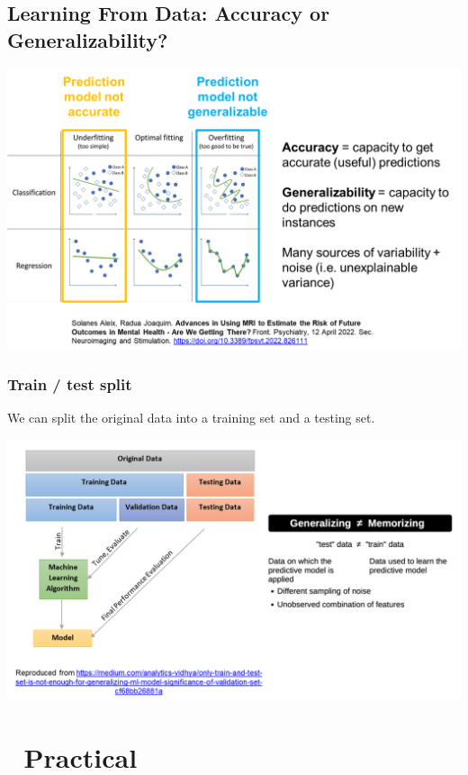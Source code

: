 \documentclass[
  letterpaper,
  DIV=11,
  numbers=noendperiod,
  oneside]{scrreprt}
\begin{document}
\hypertarget{learning-from-data-accuracy-or-generalizability}{%
\section{Learning From Data: Accuracy or
Generalizability?}\label{learning-from-data-accuracy-or-generalizability}}

\includegraphics{images/paste-FC3A1160.png}

\hypertarget{train-test-split}{%
\subsection{Train / test split}\label{train-test-split}}

We can split the original data into a training set and a testing set.

\includegraphics{images/paste-7D73149D.png}

\hypertarget{practical}{%
\chapter{\texorpdfstring{{📙}
Practical}{📙 Practical}}\label{practical}}
\end{document}
